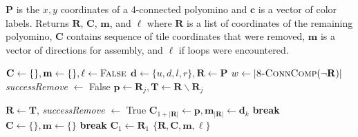 \begin{algorithm}
\newcommand\algotext[1]{\end{algorithmic}#1\begin{algorithmic}[1]}
\caption{($\mathbf{P},\mathbf{c})$   \label{alg:Erode}}
$\mathbf{P}$ is the $x,y$ coordinates of a 4-connected polyomino  and $ \mathbf{c} $ is a vector of color labels.
Returns $ \mathbf{R} $, $ \mathbf{C} $, $\mathbf{m}$, and $\mathbf{\ell}$ where $ \mathbf{R} $  is a list of coordinates of the remaining polyomino, $ \mathbf{C} $ contains sequence of tile coordinates that were removed,   $\mathbf{m}$ is a vector of directions for assembly, and $\mathbf{\ell}$ if loops were encountered.
\begin{algorithmic}[1]

\State\hbox{$\mathbf{C} \leftarrow \{\}, \mathbf{m} \leftarrow \{\}, \mathbf{\ell} \gets \textrm{\sc False}$}
\State $\mathbf{d} \gets\{u,d,l,r\}, \mathbf{R} \gets \mathbf{P}$
\State $w \gets |\text{\sc 8-ConnComp}(\neg\mathbf{R})|$ 
\State  \emph{successRemove} $\gets$ {\sc False}
\State $\mathbf{p} \gets \mathbf{R}_j,  \mathbf{T} \gets  \mathbf{R}  \backslash   \mathbf{R}_j$


\State  $\mathbf{R} \gets \mathbf{T}$,   \emph{successRemove} $\gets$ {\sc True}
\State  $\mathbf{C}_{ 1+|\mathbf{R}|} \gets \mathbf{p},  \mathbf{m}_{ |\mathbf{R}|}  \gets \mathbf{d}_k$
\EndIf
\State \textbf{break}
\EndIf
\EndFor
\EndFor
{}
\State  \hbox{$\mathbf{C} \leftarrow \{\}, \mathbf{m} \leftarrow \{\}$}
\State \textbf{break}
\EndIf
\EndFor
{}
\State  $\mathbf{C}_{ 1} \gets \mathbf{R}_1 $
\EndIf
\State \Return $\{ \mathbf{R},\mathbf{C}, \mathbf{m}, \ell \}$ 
\end{algorithmic}
\end{algorithm} 









